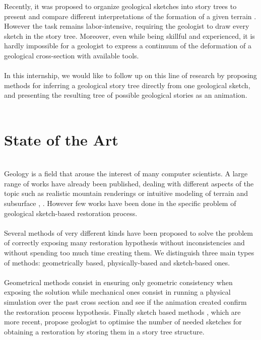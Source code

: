 \documentclass[12pt, a4paper]{report} %
\begin{document}
Recently, it was proposed to organize geological sketches into story trees to present and compare different interpretations of the formation of a given terrain \cite{lidal}. However the task remains labor-intensive, requiring the geologist to draw every sketch in the story tree. Moreover, even while being skillful and experienced, it is hardly impossible for a geologist to express a continuum of the deformation of a geological cross-section with available tools.\\\\
In this internship, we would like to follow up on this line of research by proposing methods for inferring a geological story tree directly from one geological sketch, and presenting the resulting tree of possible geological stories as an animation.\\\\

\chapter{State of the Art}\\

Geology is a field that arouse the interest of many computer scientists. A large range of works have already been published, dealing with different aspects of the topic such as realistic mountain renderings \cite{guillaume} or intuitive modeling of terrain and subsurface \cite{star}, \cite{compGeo}.
However few works have been done in the specific problem of geological sketch-based restoration process.\\\\
Several methods of very different kinds have been proposed to solve the problem of correctly exposing many restoration hypothesis without inconsistencies and without spending too much time creating them. We distinguish three main types of methods: geometrically based, physically-based and sketch-based ones.\\\\
Geometrical methods consist in ensuring only geometric consistency when exposing the solution while mechanical ones consist in running a physical simulation over the past cross section and see if the animation created confirm the restoration process hypothesis. Finally sketch based methods , which are more recent, propose geologist to optimise the number of needed sketches for obtaining a restoration by storing them in a story tree structure.\\\\
\end{document}
